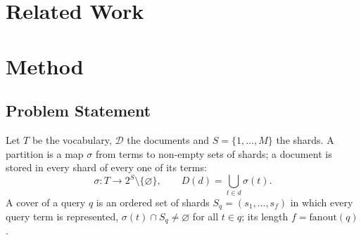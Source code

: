 \documentclass[11pt, a4paper]{article}
\newif\ifdraftnotes
\newcommand{\todo}[1]{\ifdraftnotes\par\noindent{\small\color{red!75!black}\textbf{TODO:} #1}\par\fi}
\begin{document}
\section{Related Work}

\todo{Text: distributed inverted indexes, resource selection, selective search, term-partitioned systems, co-occurrence weights, community detection and the resolution parameter, set cover and bin packing, rank-agreement measures, bootstrap. Draft and citations: \texttt{article.tex}, section 2. Materials: none.}
\nocite{manning2008,reichardt2006,gravano1999,callan1995,si2003,aly2013,kulkarni2015,kulkarni2010,dai2016,goodwin2017,risvik2013,moffat2007,moffat2006,huang2020,church1990,bouma2009,williams2022,dunning1993,robertson2009,traag2019,newman2004,traag2011,rosvall2008,karypis1998,fortunato2010,lancichinetti2009,chvatal1979,johnson1974,webber2010,efron1993,bajaj2016,kwiatkowski2019,lee2019,dean2013,csardi2006}

\section{Method}

\subsection{Problem Statement}

\todo{Text: term partitioning and the query cover (Eq.~\eqref{eq:assignment}), the completeness invariant (Eq.~\eqref{eq:invariant}) and its role, the lower bound of the shard volume and duplication (Eq.~\eqref{eq:lower-bound}) as the cause of degeneration. Materials: none.}

Let $T$ be the vocabulary, $\mathcal{D}$ the documents and $S=\{1,\dots,M\}$ the shards.
A partition is a map $\sigma$ from terms to non-empty sets of shards; a document is stored in every shard of every one of its terms:
\begin{equation}
	\sigma\colon T \to 2^{S}\setminus\{\varnothing\}, \qquad D(d)=\bigcup_{t\in d}\sigma(t).
	\label{eq:assignment}
\end{equation}
A cover of a query $q$ is an ordered set of shards $S_q=(s_1,\dots,s_{f})$ in which every query term is represented, $\sigma(t)\cap S_q\neq\varnothing$ for all $t\in q$; its length $f=\mathrm{fanout}(q)$.
\end{document}
